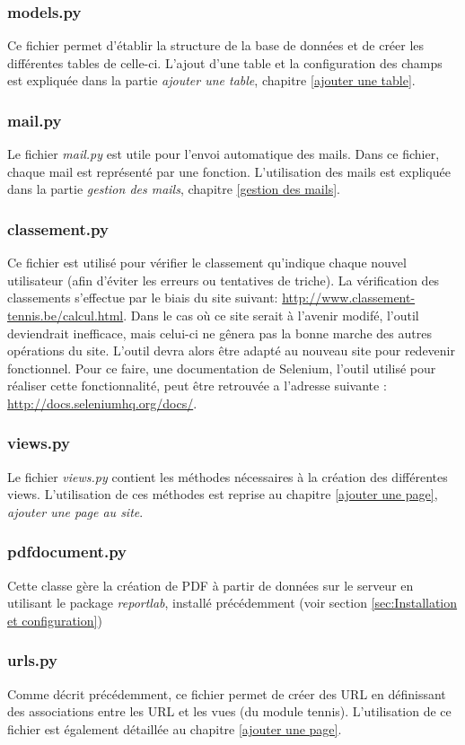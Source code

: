 \subsubsection{models.py}

Ce fichier permet d'établir la structure de la base de données et de créer les différentes tables de celle-ci. L'ajout d'une table et la configuration des champs est expliquée dans la partie \textit{ajouter une table}, chapitre \ref{ajouter une table}.

\subsubsection{mail.py}

Le fichier \textit{mail.py} est utile pour l'envoi automatique des mails. Dans ce fichier, chaque mail est représenté par une fonction. L'utilisation des mails est expliquée dans la partie \textit{gestion des mails}, chapitre \ref{gestion des mails}.

\subsubsection{classement.py} 

Ce fichier est utilisé pour vérifier le classement qu'indique chaque nouvel utilisateur (afin d'éviter les erreurs ou tentatives de triche). La vérification des classements s'effectue par le biais du site suivant: \url{http://www.classement-tennis.be/calcul.html}. Dans le cas où ce site serait à l'avenir modifé, l'outil deviendrait inefficace, mais celui-ci ne gênera pas la bonne marche des autres opérations du site. L'outil devra alors être adapté au nouveau site pour redevenir fonctionnel. Pour ce faire, une documentation de Selenium, l'outil utilisé pour réaliser cette fonctionnalité, peut être retrouvée a l'adresse suivante : \url{http://docs.seleniumhq.org/docs/}. 

\subsubsection{views.py}

Le fichier \textit{views.py} contient les méthodes nécessaires à la création des différentes views. L'utilisation de ces méthodes est reprise au chapitre \ref{ajouter une page}, \textit{ajouter une page au site}.

\subsubsection{pdfdocument.py}

Cette classe gère la création de PDF à partir de données sur le serveur en utilisant le package \textit{reportlab}, installé précédemment (voir section \ref{sec:Installation et configuration})

\subsubsection{urls.py}

Comme décrit précédemment, ce fichier permet de créer des URL en définissant des associations entre les URL et les vues (du module tennis). L'utilisation de ce fichier est également détaillée au chapitre \ref{ajouter une page}.